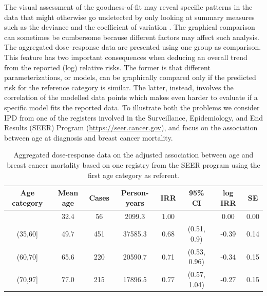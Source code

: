 \documentclass[11pt,a4paper,twoside,openany]{book}\usepackage{knitr}
\begin{document}
{The visual assessment of the goodness-of-fit may reveal specific patterns in the data that might otherwise go undetected by only looking at summary measures such as the deviance and the coefficient of variation \citep{kvaalseth1985cautionary}. The graphical comparison can sometimes be cumbersome because different factors may affect such analysis. The aggregated dose--response data are presented using one group as comparison. This feature has two important consequences when deducing an overall trend from the reported (log) relative risks. The former is that different parameterizations, or models, can be graphically compared only if the predicted risk for the reference category is similar. The latter, instead, involves the correlation of the modelled data points which makes even harder to evaluate if a specific model fits the reported data. To illustrate both the problems we consider IPD from one of the registers involved in the Surveillance, Epidemiology, and End Results (SEER) Program (\url{https://seer.cancer.gov}), and focus on the association between age at diagnosis and breast cancer mortality. 

\begin{table}[ht]
\centering
\caption{Aggregated dose-response data on the adjusted association between age and breast cancer mortality based on one registry from the SEER program using the first age category as referent.
         } 
\label{tab:breast_ad}
\begin{tabular}{cccccccc}
  \hline
Age category & Mean age & Cases & Person-years & IRR & 95\% CI & log IRR & SE \\ 
  \hline
[20,35] & 32.4 & 56 & 2099.3 & 1.00 &  & 0.00 & 0.00 \\ 
  (35,60] & 49.7 & 451 & 37585.3 & 0.68 & (0.51, 0.9) & -0.39 & 0.14 \\ 
  (60,70] & 65.6 & 220 & 20590.7 & 0.71 & (0.53, 0.96) & -0.34 & 0.15 \\ 
  (70,97] & 77.0 & 215 & 17896.5 & 0.77 & (0.57, 1.04) & -0.27 & 0.15 \\ 
   \hline
\end{tabular}
\end{table}


}
\end{document}
